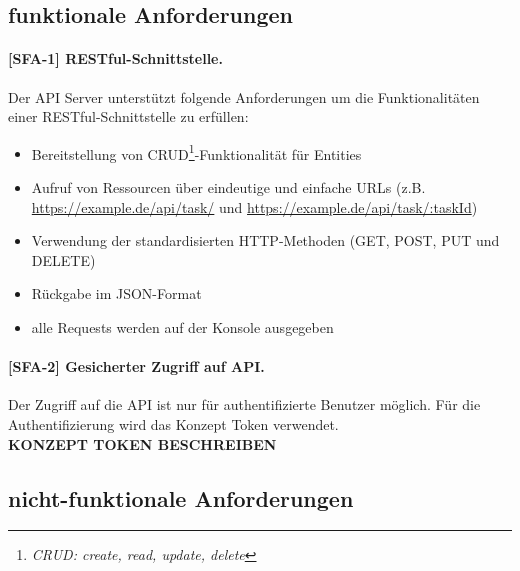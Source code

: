 \subsection{funktionale Anforderungen}

\paragraph{[SFA-1] RESTful-Schnittstelle. }Der API Server unterstützt folgende Anforderungen um die Funktionalitäten einer RESTful-Schnittstelle zu erfüllen:

\begin{itemize}  
\item Bereitstellung von CRUD\footnote{\textit{CRUD: create, read, update, delete}}-Funktionalität für Entities
\item Aufruf von Ressourcen über eindeutige und einfache URLs (z.B. \url{https://example.de/api/task/} und \url{https://example.de/api/task/:taskId}) 
\item Verwendung der standardisierten HTTP-Methoden (GET, POST, PUT und DELETE) 
\item Rückgabe im JSON-Format
\item alle Requests werden auf der Konsole ausgegeben
\end{itemize}


\paragraph{[SFA-2] Gesicherter Zugriff auf API.} Der Zugriff auf die API ist nur für authentifizierte Benutzer möglich. Für die Authentifizierung wird das Konzept Token verwendet. \\
\textbf{KONZEPT TOKEN BESCHREIBEN}

\newpage
\subsection{nicht-funktionale Anforderungen}
